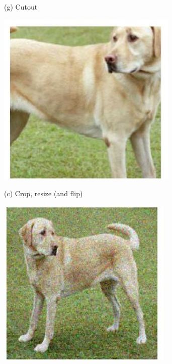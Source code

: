 \documentclass[10pt]{article}
\begin{document}
(g) Cutout

\begin{center}
\includegraphics[max width=\textwidth]{2024_01_08_7c14f4867d7823fc5a52g-14(1)}
\end{center}

(c) Crop, resize (and flip)

\begin{center}
\includegraphics[max width=\textwidth]{2024_01_08_7c14f4867d7823fc5a52g-14(2)}
\end{center}
\end{document}
